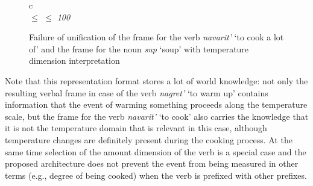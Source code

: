 \begin{figure}
\begin{tabular}{c}
\\
 $\leq$  $\leq$ \textit{100}
\end{tabular}
\caption{Failure of unification of the frame for the verb \textit{navarit'} `to cook a lot of' and the frame for the noun \textit{sup} `soup' with temperature dimension interpretation \label{frame:navarit:soup:temp}}
\end{figure}

Note that this representation format stores a lot of world knowledge: not only the resulting verbal frame in case of the verb \textit{nagret'} `to warm up' contains information that the event of warming something proceeds along the temperature scale, but the frame for the verb \textit{navarit'} `to cook' also carries the knowledge that it is not the temperature domain that is relevant in this case, although temperature changes are definitely present during the cooking process. At the same time selection of the amount dimension of the verb is a special case and the proposed architecture does not prevent the event from being measured in other terms (e.g., degree of being cooked) when the verb is prefixed with other prefixes.


